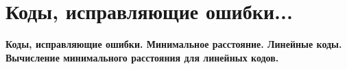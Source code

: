 \section{
    Коды, исправляющие ошибки...
}

\textbf{Коды, исправляющие ошибки. Минимальное расстояние. Линейные коды. Вычисление минимального расстояния для линейных кодов.}
